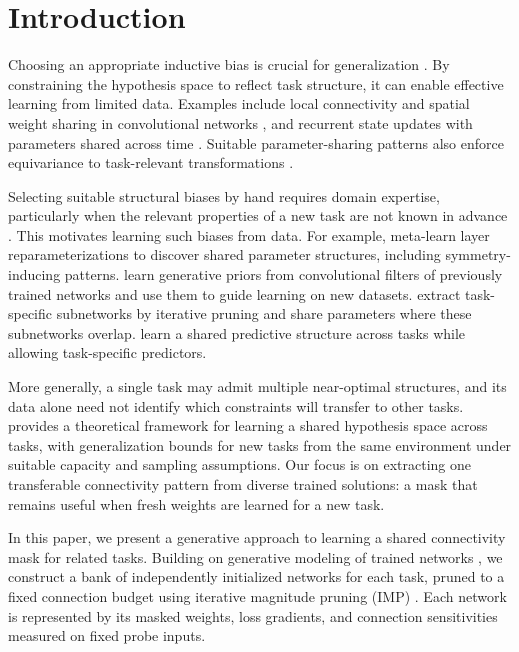 \section{Introduction}

Choosing an appropriate inductive bias is crucial for generalization \cite{baxter2000model}.
By constraining the hypothesis space to reflect task structure, it can enable effective learning from limited data.
Examples include local connectivity and spatial weight sharing in convolutional networks \cite{lecun1998gradient}, and recurrent state updates with parameters shared across time \cite{elman1990finding}.
Suitable parameter-sharing patterns also enforce equivariance to task-relevant transformations \cite{ravanbakhsh2017equivariance}.

Selecting suitable structural biases by hand requires domain expertise, particularly when the relevant properties of a new task are not known in advance \cite{yeh2022equivariance}.
This motivates learning such biases from data.
For example, \citet{zhou2021meta} meta-learn layer reparameterizations to discover shared parameter structures, including symmetry-inducing patterns.
\citet{atanov2019deep} learn generative priors from convolutional filters of previously trained networks and use them to guide learning on new datasets.
\citet{sun2020sparse} extract task-specific subnetworks by iterative pruning and share parameters where these subnetworks overlap.
\citet{ando2005framework} learn a shared predictive structure across tasks while allowing task-specific predictors.

More generally, a single task may admit multiple near-optimal structures, and its data alone need not identify which constraints will transfer to other tasks.
\citet{baxter2000model} provides a theoretical framework for learning a shared hypothesis space across tasks, with generalization bounds for new tasks from the same environment under suitable capacity and sampling assumptions.
Our focus is on extracting one transferable connectivity pattern from diverse trained solutions: a mask that remains useful when fresh weights are learned for a new task.

In this paper, we present a generative approach to learning a shared connectivity mask for related tasks.
Building on generative modeling of trained networks \cite{atanov2019deep,schurholt2022hyper}, we construct a bank of independently initialized networks for each task, pruned to a fixed connection budget using iterative magnitude pruning (IMP) \cite{frankle2019lottery}.
Each network is represented by its masked weights, loss gradients, and connection sensitivities measured on fixed probe inputs.

